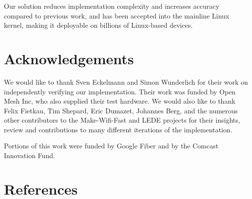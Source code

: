 \documentclass[english]{scrartcl}
\begin{document}
Our solution reduces implementation complexity and increases accuracy compared
to previous work, and has been accepted into the mainline Linux kernel, making
it deployable on billions of Linux-based devices.

\section{Acknowledgements}
We would like to thank Sven Eckelmann and Simon Wunderlich for their work on
independently verifying our implementation. Their work was funded by Open Mesh
Inc, who also supplied their test hardware. We would also like to thank Felix
Fietkau, Tim Shepard, Eric Dumazet, Johannes Berg, and the numerous other
contributors to the Make-Wifi-Fast and LEDE projects for their insights, review
and contributions to many different iterations of the implementation.

Portions of this work were funded by Google Fiber and by the Comcast Innovation
Fund.

\section{References}
\label{sec:org5674c9e}

\printbibliography[heading=none]
\end{document}

